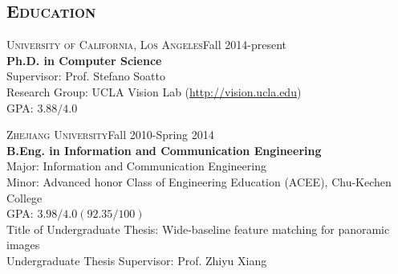 \documentclass[margin, line, 10pt]{res} %
\begin{document}
\begin{resume}


%


\section{\textsc{Education}}
\textsc{University of California, Los Angeles}\hfill{Fall 2014-present}\\
{\bf Ph.D. in Computer Science}\\
Supervisor: Prof. Stefano Soatto\\
Research Group: UCLA Vision Lab (\url{http://vision.ucla.edu})\\
GPA: $3.88/4.0$

\textsc{Zhejiang University}\hfill{Fall 2010-Spring 2014}\\
{\bf B.Eng. in Information and Communication Engineering}\\
Major: Information and Communication Engineering\\
Minor: Advanced honor Class of Engineering Education (ACEE), Chu-Kechen College\\
GPA: $3.98/4.0 (92.35/100)$\\
Title of Undergraduate Thesis: Wide-baseline feature matching for panoramic images\\
Undergraduate Thesis Supervisor: Prof. Zhiyu Xiang

% 


\end{resume}
\end{document}
